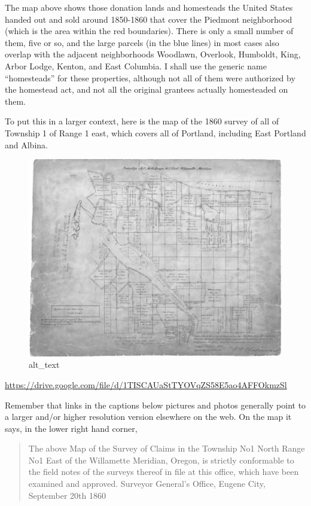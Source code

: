 \documentclass[
  12pt,
]{book}
\begin{document}
The map above shows those donation lands and homesteads the United States handed out and sold around 1850-1860 that cover the Piedmont neighborhood (which is the area within the red boundaries). There is only a small number of them, five or so, and the large parcels (in the blue lines) in most cases also overlap with the adjacent neighborhoods Woodlawn, Overlook, Humboldt, King, Arbor Lodge, Kenton, and East Columbia. I shall use the generic name ``homesteads'' for these properties, although not all of them were authorized by the homestead act, and not all the original grantees actually homesteaded on them.

To put this in a larger context, here is the map of the 1860 survey of all of Township 1 of Range 1 east, which covers all of Portland, including East Portland and Albina.

\begin{figure}
\centering
\includegraphics{images/02_images/image2.png}
\caption{alt\_text}
\end{figure}

\url{https://drive.google.com/file/d/1TISCAUaStTYOVqZS58E5ao4AFFOkmzSl}

Remember that links in the captions below pictures and photos generally point to a larger and/or higher resolution version elsewhere on the web. On the map it says, in the lower right hand corner,

\begin{quote}
The above Map of the Survey of Claims in the Township No1 North Range No1 East of the Willamette Meridian, Oregon, is strictly conformable to the field notes of the surveys thereof in file at this office, which have been examined and approved.
Surveyor General's Office, Eugene City, September 20th 1860
\end{quote}
\end{document}
